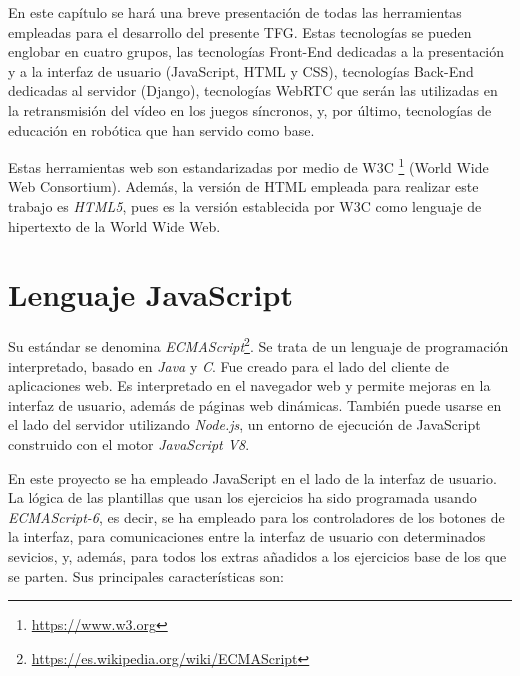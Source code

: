 \documentclass[a4paper, 12pt]{book}
\begin{document}
En este capítulo se hará una breve presentación de todas las herramientas empleadas para el desarrollo del presente TFG. Estas tecnologías se pueden englobar en cuatro grupos, las tecnologías Front-End dedicadas a la presentación y a la interfaz de usuario (JavaScript, HTML y CSS), tecnologías Back-End dedicadas al servidor (Django), tecnologías WebRTC que serán las utilizadas en la retransmisión del vídeo en los juegos síncronos, y, por último, tecnologías de educación en robótica que han servido como base. 

Estas herramientas web son estandarizadas por medio de W3C \footnote{\url{https://www.w3.org}} (World Wide Web Consortium). Además, la versión de HTML empleada para realizar este trabajo es \emph{HTML5}, pues es la versión establecida por W3C como lenguaje de hipertexto de la World Wide Web.

\section{Lenguaje JavaScript}
\label{sec:javascript}

Su estándar se denomina \textit{ECMAScript}\footnote{\url{https://es.wikipedia.org/wiki/ECMAScript}}. Se trata de un lenguaje de programación interpretado, basado en \textit{Java} y \textit{C}. Fue creado para el lado del cliente de aplicaciones web. Es interpretado en el navegador web y permite mejoras en la interfaz de usuario, además de páginas web dinámicas. También puede usarse en el lado del servidor utilizando \textit{Node.js}, un entorno de ejecución de JavaScript construido con el motor \textit{JavaScript V8}.

En este proyecto se ha empleado JavaScript en el lado de la interfaz de usuario. La lógica de las plantillas que usan los ejercicios ha sido programada usando \textit{ECMAScript-6}, es decir, se ha empleado para los controladores de los botones de la interfaz, para comunicaciones entre la interfaz de usuario con determinados sevicios, y, además, para todos los extras añadidos a los ejercicios base de los que se parten. Sus principales características son:

\end{document}
